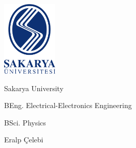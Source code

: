 \documentclass{report}
\author{Eralp Çelebi}
\begin{document}
	
	\begin{titlepage}
		\centering
		
		\hfill \includegraphics[width=75pt, keepaspectratio=true]{logo} \par
		
		\vspace{ 10 \baselineskip }
		
		{\huge Sakarya University}
		
		\vspace{ 4 \baselineskip }
		
		{\large BEng. Electrical-Electronics Engineering}
		
		\vspace{ 1 \baselineskip }
		
		{\large BSci. Physics}
				
		\vspace{ 4 \baselineskip }
		
		{\large Eralp Çelebi}
		
        \vfill
		
	\end{titlepage}
	
	\pagestyle{fancyplain}
	\fancyhead{}
	
	
	\tableofcontents
	\newpage

    
\end{document}
